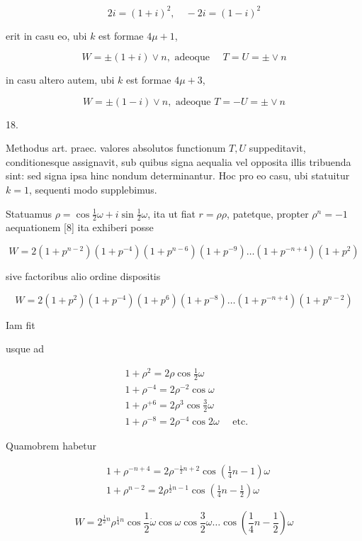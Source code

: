 \documentclass[10pt]{article}
\begin{document}
\[
2 i=(1+i)^{2}, \quad-2 i=(1-i)^{2}
\]

erit in casu eo, ubi \(k\) est formae \(4 \mu+1\),

\[
W= \pm(1+i) \vee n, \text { adeoque } \quad T=U= \pm \vee n
\]

in casu altero autem, ubi \(k\) est formae \(4 \mu+3\),

\[
W= \pm(1-i) \vee n, \text { adeoque } T=-U= \pm \vee n
\]

18.

Methodus art. praec. valores absolutos functionum \(T, U\) suppeditavit, conditionesque assignavit, sub quibus signa aequalia vel opposita illis tribuenda sint: sed signa ipsa hinc nondum determinantur. Hoc pro eo casu, ubi statuitur \(k=1\), sequenti modo supplebimus.

Statuamus \(\rho=\cos \frac{1}{2} \omega+i \sin \frac{1}{2} \omega\), ita ut fiat \(r=\rho \rho\), patetque, propter \(\rho^{n}=-1\) aequationem [8] ita exhiberi posse

\[
W=2\left(1+p^{n-2}\right)\left(1+p^{-4}\right)\left(1+p^{n-6}\right)\left(1+p^{-9}\right) \ldots\left(1+p^{-n+4}\right)\left(1+p^{2}\right)
\]

sive factoribus alio ordine dispositis

\[
W=2\left(1+p^{2}\right)\left(1+p^{-4}\right)\left(1+p^{6}\right)\left(1+p^{-8}\right) \ldots\left(1+p^{-n+4}\right)\left(1+p^{n-2}\right)
\]

Iam fit

usque ad

\[
\begin{aligned}
& 1+\rho^{2}=2 \rho \cos \frac{1}{2} \omega \\
& 1+\rho^{-4}=2 \rho^{-2} \cos \omega \\
& 1+\rho^{+6}=2 \rho^{3} \cos \frac{3}{2} \omega \\
& 1+\rho^{-8}=2 \rho^{-4} \cos 2 \omega \quad \text { etc. }
\end{aligned}
\]

Quamobrem habetur

\[
\begin{aligned}
& 1+\rho^{-n+4}=2 \rho^{-\frac{1}{2} n+2} \cos \left(\frac{1}{4} n-1\right) \omega \\
& 1+\rho^{n-2}=2 \rho^{\frac{1}{2} n-1} \cos \left(\frac{1}{4} n-\frac{1}{2}\right) \omega
\end{aligned}
\]

\[
W=2^{\frac{1}{2} n} \rho^{\frac{1}{4} n} \cos \frac{1}{2} \dot{\omega} \cos \omega \cos \frac{3}{2} \omega \ldots \cos \left(\frac{1}{4} n-\frac{1}{2}\right) \omega
\]
\end{document}
